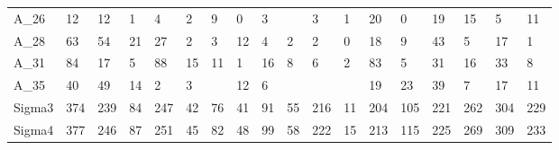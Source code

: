 \begin{tabular}{llllllllllllllllll}
A\_26   &      12 &         12 &          1 &     4 &     2 &       9 &     0 &          3 &       &    3 &    1 &         20 &      0 &    19 &    15 &         5 &             11 \\
A\_28   &      63 &         54 &         21 &    27 &     2 &       3 &    12 &          4 &     2 &    2 &    0 &         18 &      9 &    43 &     5 &        17 &              1 \\
A\_31   &      84 &         17 &          5 &    88 &    15 &      11 &     1 &         16 &     8 &    6 &    2 &         83 &      5 &    31 &    16 &        33 &              8 \\
A\_35   &      40 &         49 &         14 &     2 &     3 &         &    12 &          6 &       &      &      &         19 &     23 &    39 &     7 &        17 &             11 \\
Sigma3 &     374 &        239 &         84 &   247 &    42 &      76 &    41 &         91 &    55 &  216 &   11 &        204 &    105 &   221 &   262 &       304 &            229 \\
Sigma4 &     377 &        246 &         87 &   251 &    45 &      82 &    48 &         99 &    58 &  222 &   15 &        213 &    115 &   225 &   269 &       309 &            233 \\
\bottomrule
\end{tabular}
